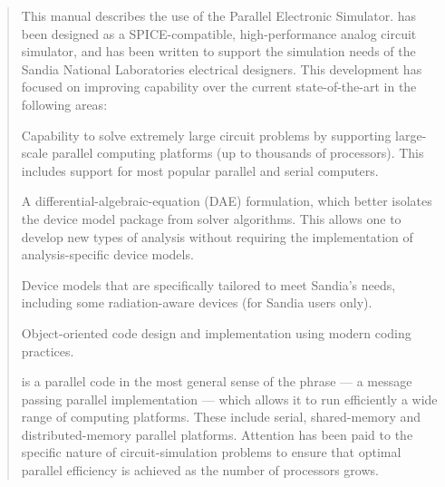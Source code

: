 \documentclass[11pt,report]{SANDreport}
\begin{document}
\begin{abstract}

This manual describes the use of the \Xyce{} Parallel Electronic
Simulator.  \Xyce{} has been designed as a SPICE-compatible, 
high-performance analog circuit simulator, and has 
been written to support the simulation needs of the Sandia National
Laboratories electrical designers.  This development has 
focused on improving capability over the current
state-of-the-art in the following areas:

\begin{XyceItemize}

\item Capability to solve extremely large circuit problems by supporting
  large-scale parallel computing platforms (up to thousands of processors).
  This includes support for most popular parallel and serial computers.
\item A differential-algebraic-equation (DAE) formulation, which better isolates the 
  device model package from solver algorithms. This allows one to develop new types of
  analysis without requiring the implementation of analysis-specific device models.
\item Device models that are specifically tailored to meet Sandia's needs,
  including some radiation-aware devices (for Sandia users only).
\item Object-oriented code design and implementation using modern
  coding practices.

\end{XyceItemize}

\Xyce{} is a parallel code in the most general sense of the phrase --- a message
passing parallel implementation --- which allows it to run efficiently a
wide range of computing platforms.  These include serial,
shared-memory and distributed-memory parallel platforms.  
Attention has been paid to the specific nature
of circuit-simulation problems to ensure that optimal parallel efficiency is
achieved as the number of processors grows.

\end{abstract}

\clearpage



\cleardoublepage
{}
\tableofcontents

\cleardoublepage
{}
\listoffigures
\end{document}
